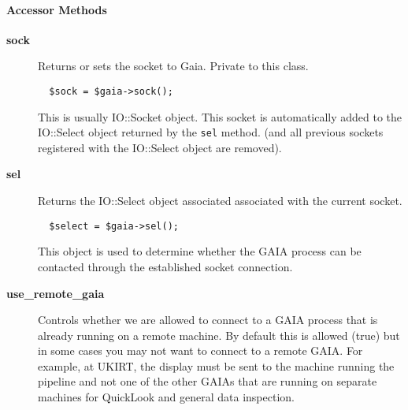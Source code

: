 \paragraph*{Accessor Methods\label{ORAC::Display::GAIA_Accessor_Methods}}
\begin{description}

\item[\textbf{sock}] \mbox{}

Returns or sets the socket to Gaia. Private to this class.

\begin{verbatim}
  $sock = $gaia->sock();
\end{verbatim}


This is usually IO::Socket object. This socket is automatically
added to the IO::Select object returned by the \texttt{sel} method.
(and all previous sockets registered with the IO::Select object
are removed).


\item[\textbf{sel}] \mbox{}

Returns the IO::Select object associated associated with the
current socket.

\begin{verbatim}
  $select = $gaia->sel();
\end{verbatim}


This object is used to determine whether the GAIA process can be
contacted through the established socket connection.


\item[\textbf{use\_remote\_gaia}] \mbox{}

Controls whether we are allowed to connect to a GAIA process that
is already running on a remote machine. By default this is allowed
(true) but in some cases you may not want to connect to a remote
GAIA. For example, at UKIRT, the display must be sent to the machine
running the pipeline and not one of the other GAIAs that are running
on separate machines for QuickLook and general data inspection.

\end{description}
